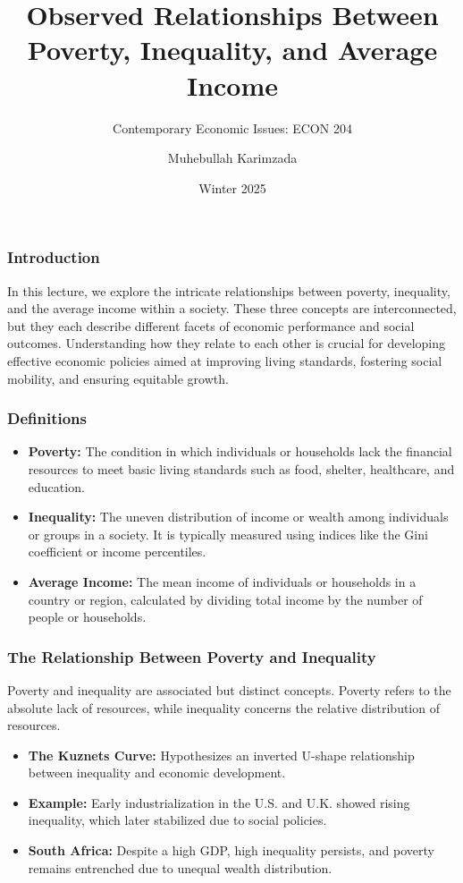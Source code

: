 \documentclass{beamer}
\title{Observed Relationships Between Poverty, Inequality, and Average Income}
\subtitle{Contemporary Economic Issues: ECON 204}
\author{Muhebullah Karimzada}
\date{Winter 2025}
\begin{document}
\frame{\titlepage}

\begin{frame}
\frametitle{Introduction}
In this lecture, we explore the intricate relationships between poverty, inequality, and the average income within a society. These three concepts are interconnected, but they each describe different facets of economic performance and social outcomes. Understanding how they relate to each other is crucial for developing effective economic policies aimed at improving living standards, fostering social mobility, and ensuring equitable growth.
\end{frame}

\begin{frame}
\frametitle{Definitions}
\begin{itemize}
    \item \textbf{Poverty:} The condition in which individuals or households lack the financial resources to meet basic living standards such as food, shelter, healthcare, and education.
    \item \textbf{Inequality:} The uneven distribution of income or wealth among individuals or groups in a society. It is typically measured using indices like the Gini coefficient or income percentiles.
    \item \textbf{Average Income:} The mean income of individuals or households in a country or region, calculated by dividing total income by the number of people or households.
\end{itemize}
\end{frame}

\begin{frame}
\frametitle{The Relationship Between Poverty and Inequality}
Poverty and inequality are associated but distinct concepts. Poverty refers to the absolute lack of resources, while inequality concerns the relative distribution of resources.
\begin{itemize}
    \item \textbf{The Kuznets Curve:} Hypothesizes an inverted U-shape relationship between inequality and economic development.
    \item \textbf{Example:} Early industrialization in the U.S. and U.K. showed rising inequality, which later stabilized due to social policies.
    \item \textbf{South Africa:} Despite a high GDP, high inequality persists, and poverty remains entrenched due to unequal wealth distribution.
\end{itemize}
\end{frame}
\end{document}

